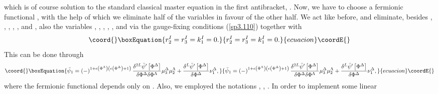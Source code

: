 \documentclass[a4paper,12pt]{article}
\begin{document}
which is of course solution to the standard classical master equation in the
first antibracket, \coordHE{}. Now, we
have to choose a fermionic functional \coordHE{}, with the help of
which we eliminate half of the variables in favour of the other half. We act
like before, and eliminate, besides \coordHE{}, \coordHE{}, \coordHE{}, \coordHE{}, \coordHE{}, \coordHE{} and \coordHE{}, also the variables \coordHE{}%
, \coordHE{}, \coordHE{}, \coordHE{}, \coordHE{}, \coordHE{} and \coordHE{} via the gauge-fixing
conditions (\ref{sp3.110}) together with 
\begin{equation}\coord{}\boxEquation{
r_{2}^{I}=r_{3}^{I}=k_{1}^{I}=0.  \label{sp3.134}
}{
r_{2}^{I}=r_{3}^{I}=k_{1}^{I}=0.  }{ecuacion}\coordE{}\end{equation}
This can be done through 
\begin{equation}\coord{}\boxEquation{
\bar{\psi}_{1}=\left( -\right) ^{1+\epsilon \left( \Phi ^{\Lambda }\right)
\left( \epsilon \left( \Phi ^{\Delta }\right) +1\right) }\frac{\delta ^{2L}
\bar{\psi}^{\prime }\left[ \Phi ^{\Delta }\right] }{\delta \Phi ^{\Delta
}\delta \Phi ^{\Lambda }}\mu _{3}^{\Delta }\mu _{2}^{\Lambda }+\frac{\delta
^{L}\bar{\psi}^{\prime }\left[ \Phi ^{\Delta }\right] }{\delta \Phi ^{\Delta
}}\nu _{1}^{\Delta },  \label{sp3.135}
}{
\bar{\psi}_{1}=\left( -\right) ^{1+\epsilon \left( \Phi ^{\Lambda }\right)
\left( \epsilon \left( \Phi ^{\Delta }\right) +1\right) }\frac{\delta ^{2L}
\bar{\psi}^{\prime }\left[ \Phi ^{\Delta }\right] }{\delta \Phi ^{\Delta
}\delta \Phi ^{\Lambda }}\mu _{3}^{\Delta }\mu _{2}^{\Lambda }+\frac{\delta
^{L}\bar{\psi}^{\prime }\left[ \Phi ^{\Delta }\right] }{\delta \Phi ^{\Delta
}}\nu _{1}^{\Delta },  }{ecuacion}\coordE{}\end{equation}
where the fermionic functional \myHighlight{$\bar{\psi}^{\prime }$}\coordHE{} depends only on \coordHE{}. Also, we employed the
notations \coordHE{}, \coordHE{}, \coordHE{}. In order to implement some linear
\end{document}
